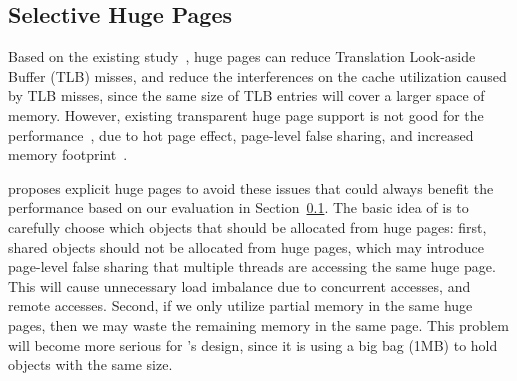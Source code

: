 


\subsection{Selective Huge Pages} 
\label{sec:hugepage}

 Based on the existing study~\cite{hugepages}, huge pages can reduce Translation Look-aside Buffer (TLB) misses, and reduce the interferences on the cache utilization caused by TLB misses, since the same size of TLB entries will cover a larger space of memory. However, existing transparent huge page support is not good for the performance~\cite{Gaud:2014:LPM:2643634.2643659, DBLP:conf/asplos/PanwarBG19}, due to hot page effect, page-level false sharing, and increased memory footprint~\cite{DBLP:conf/asplos/MaasAIJMR20}.
 
\NM{} proposes explicit huge pages to avoid these issues that could always benefit the performance based on our evaluation in Section~\ref{sec:hugepage}. The basic idea of \NM{} is to carefully choose which objects that should be allocated from huge pages: first, shared objects should not be allocated from huge pages, which may introduce page-level false sharing that multiple threads are accessing the same huge page. This will cause unnecessary load imbalance due to concurrent accesses, and remote accesses. Second, if we only utilize partial memory in the same huge pages, then we may waste the remaining memory in the same page. This problem will become more serious for \NM{}'s design, since it is using a big bag (1MB) to hold objects with the same size. 

